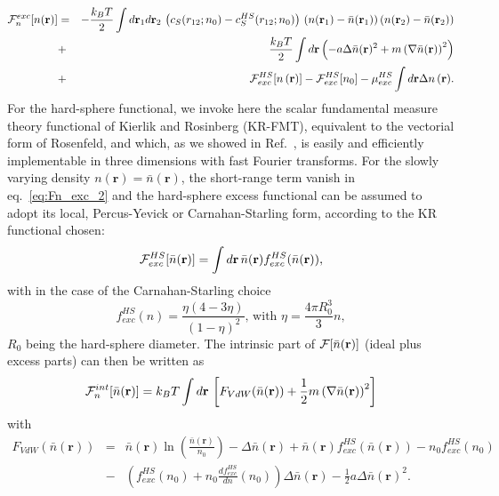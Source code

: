\documentclass[aip,jcp,showpacs,amsmath,amssymb,superscriptaddress]{revtex4-1}
\newcommand{\be}{\begin{equation}}
\newcommand{\ee}{\end{equation}}
\newcommand{\bea}{\begin{eqnarray}}
\newcommand{\eea}{\end{eqnarray}}
\newcommand{\nn}{\nonumber}
\newcommand{\onehalf}{\frac{1}{2}}
\newcommand{\kBTotwo}{\frac{k_BT}{2}}
\newcommand{\RR}{\mathbf{r}}
\newcommand{\rr}{\mathbf{r}}
\newcommand{\rhon}{{n\left({\mathbf r}\right)}}
\newcommand{\F}{{\cal F}}
\newcommand{\rhonbar}{\bar{n}({\mathbf r})}
\newcommand{\nbar}{\bar{n}}
\begin{document}
\bea \label{eq:Fn_tot}
\F_n^{exc}[n(\rr)] &= & - \frac{k_BT}{2} \int d\rr_1 d\rr_2 \, \left( c_S(r_{12};n_0)- c_S^{HS}(r_{12};n_0) \right) \, (n(\rr_1) - \nbar(\rr_1)) \,  (n(\rr_2) - \nbar(\rr_2)) \nn \\
&+& \kBTotwo \int d\rr \left( -a  \Delta \rhonbar^2 + m \left( \mathbf{\nabla}  \nbar(\RR) \right)^2 \right) \nn \\
& + &\F_{exc}^{HS}[\rhon] -  \F_{exc}^{HS}[n_0] - \mu_{exc}^{HS} \int d\rr \Delta \rhon.
\label{eq:Fn_exc_2}
\eea
For the hard-sphere functional, we invoke here the scalar fundamental measure theory functional of Kierlik and Rosinberg (KR-FMT)\cite{kierlik-rosinberg90,kierlik-rosinberg91}, equivalent to the vectorial form of Rosenfeld\cite{rosenfeld89}, and which, as we showed in Ref.~,  is easily and efficiently implementable in three dimensions with fast Fourier transforms. For the slowly varying density $\rhon = \rhonbar$, the short-range term vanish in eq.~\ref{eq:Fn_exc_2} and the hard-sphere excess functional can be assumed to adopt its local, Percus-Yevick or Carnahan-Starling form, according to the KR functional chosen\cite{levesque12_1}:
\be
\F_{exc}^{HS}[\rhonbar]  = \int d\rr \, \rhonbar f_{exc}^{HS}(\rhonbar),
\ee
with in the case of the Carnahan-Starling choice
\be
f_{exc}^{HS}(n)= \frac{\eta(4 - 3 \eta)}{(1-\eta)^2}, \, \mathrm{with} \, \, \eta = \frac{4 \pi R_0^3}{3} n,
\ee
$R_0$ being the hard-sphere diameter. The intrinsic part of $\F[\rhonbar]$ (ideal plus excess parts) can then be written as 
\be 
\F_{n}^{int}[\rhonbar] = k_BT \int d\rr \, \left[ F_{VdW}(\rhonbar) + \onehalf m \left( \mathbf{\nabla}  \nbar(\RR) \right)^2 \right]
\label{eq:F_n_int}
\ee 
with
\bea
F_{VdW}(\rhonbar) & = &   \rhonbar \ln\left(\frac{\rhonbar}{n_0}\right)- \Delta \rhonbar
+ \rhonbar f_{exc}^{HS}(\rhonbar) -  n_0 f_{exc}^{HS}(n_0) \nn \\
&-& \left( f_{exc}^{HS}(n_0)  + n_0 \frac{df_{exc}^{HS}}{dn}(n_0) \right) \Delta \rhonbar - \onehalf a \Delta \rhonbar^2.
\label{eq:F_VdW}
\eea
\end{document}
